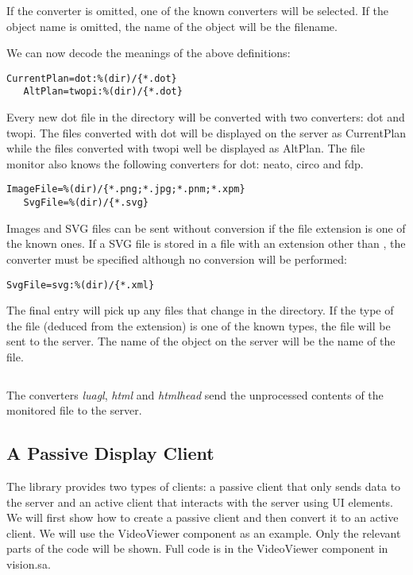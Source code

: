 If the converter is omitted, one of the known converters will be selected.
If the object name is omitted, the name of the object will be the filename.

We can now decode the meanings of the above definitions:

\begin{Verbatim}[fontsize=\scriptsize,gobble=3]
   CurrentPlan=dot:%(dir)/{*.dot}
   AltPlan=twopi:%(dir)/{*.dot}
\end{Verbatim}

Every new dot file in the directory will be converted with two converters: dot
and twopi. The files converted with dot will be displayed on the server as
CurrentPlan while the files converted with twopi well be displayed as AltPlan.
The file monitor also knows the following converters for dot: neato, circo and
fdp.

\begin{Verbatim}[fontsize=\scriptsize,gobble=3]
   ImageFile=%(dir)/{*.png;*.jpg;*.pnm;*.xpm}
   SvgFile=%(dir)/{*.svg}
\end{Verbatim}

Images and SVG files can be sent without conversion if the file extension is
one of the known ones. If a SVG file is stored in a file with an extension
other than , the converter must be specified although no conversion
will be performed:

\begin{Verbatim}[fontsize=\scriptsize,gobble=3]
   SvgFile=svg:%(dir)/{*.xml}
\end{Verbatim}

The final entry will pick up any files that change in the directory. If the
type of the file (deduced from the extension) is one of the known types, the
file will be sent to the server. The name of the object on the server will be
the name of the file.

\begin{Verbatim}[fontsize=\scriptsize,gobble=3]
   %(dir)/{*}"
\end{Verbatim}

The converters {\em luagl}, {\em html} and {\em htmlhead} send the unprocessed
contents of the monitored file to the server.

\subsection{A Passive Display Client}\label{section:PassiveClient} 

The library provides two types of clients: a passive client that only sends
data to the server and an active client that interacts with the server using UI
elements. We will first show how to create a passive client and then convert it
to an active client. We will use the VideoViewer component as an example. Only
the relevant parts of the code will be shown. Full code is in the VideoViewer
component in vision.sa.

